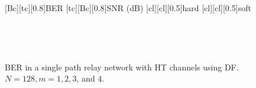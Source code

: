 \begin{figure}
    [Bc][tc][0.8]{BER}
    [tc][Bc][0.8]{SNR (dB)}
    [cl][cl][0.5]{hard}
    [cl][cl][0.5]{soft}

\centerline{
	 \\
}
\centerline{
	 \\
}
\caption{BER in a single path relay network with HT channels using DF.  $N = 128, m = 1, 2, 3$, and $4$.}
\label{fig:sp_df_ber_plots_HT}
\end{figure}

